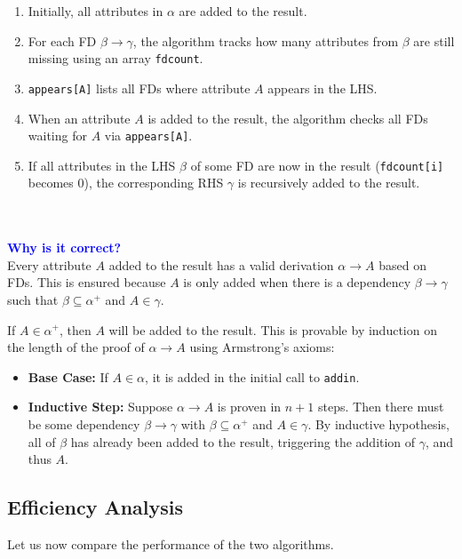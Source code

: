 \documentclass[12pt,a4paper]{article}
\begin{document}
\begin{enumerate}
    \item Initially, all attributes in $\alpha$ are added to the result.
    \item For each FD $\beta \rightarrow \gamma$, the algorithm tracks how many attributes from $\beta$ are still missing using an array \texttt{fdcount}.
    \item \texttt{appears[A]} lists all FDs where attribute $A$ appears in the LHS.
    \item When an attribute $A$ is added to the result, the algorithm checks all FDs waiting for $A$ via \texttt{appears[A]}.
    \item If all attributes in the LHS $\beta$ of some FD are now in the result (\texttt{fdcount[i]} becomes 0), the corresponding RHS $\gamma$ is recursively added to the result.
\end{enumerate}\\
\\
\textcolor{blue}{\textbf{Why is it correct?}}\\
Every attribute $A$ added to the result has a valid derivation $\alpha \rightarrow A$ based on FDs. This is ensured because $A$ is only added when there is a dependency $\beta \rightarrow \gamma$ such that $\beta \subseteq \alpha^+$ and $A \in \gamma$.
    
 If $A \in \alpha^+$, then $A$ will be added to the result. This is provable by induction on the length of the proof of $\alpha \rightarrow A$ using Armstrong's axioms:
    \begin{itemize}
        \item \textbf{Base Case:} If $A \in \alpha$, it is added in the initial call to \texttt{addin}.
        \item \textbf{Inductive Step:} Suppose $\alpha \rightarrow A$ is proven in $n+1$ steps. Then there must be some dependency $\beta \rightarrow \gamma$ with $\beta \subseteq \alpha^+$ and $A \in \gamma$. By inductive hypothesis, all of $\beta$ has already been added to the result, triggering the addition of $\gamma$, and thus $A$.
    \end{itemize}


\subsection*{Efficiency Analysis}

Let us now compare the performance of the two algorithms.\\
\end{document}
